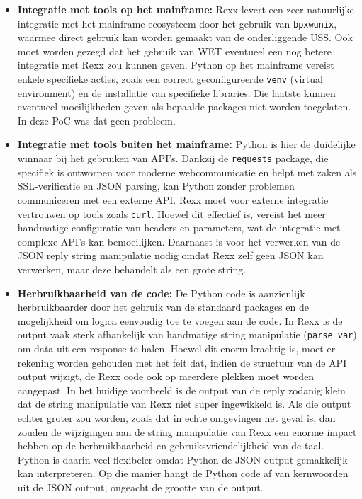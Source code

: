 \begin{itemize}
\item \textbf{Integratie met tools op het mainframe:}
Rexx levert een zeer natuurlijke integratie met het mainframe ecosysteem door het gebruik van \texttt{bpxwunix}, waarmee direct gebruik kan worden gemaakt van de onderliggende USS. Ook moet worden gezegd dat het gebruik van WET eventueel een nog betere integratie met Rexx zou kunnen geven. Python op het mainframe vereist enkele specifieke acties, zoals een correct geconfigureerde \texttt{venv} (virtual environment) en de installatie van specifieke libraries. Die laatste kunnen eventueel moeilijkheden geven als bepaalde packages niet worden toegelaten. In deze PoC was dat geen probleem.

\item \textbf{Integratie met tools buiten het mainframe:}
Python is hier de duidelijke winnaar bij het gebruiken van API's. Dankzij de \texttt{requests} package, die specifiek is ontworpen voor moderne webcommunicatie en helpt met zaken als SSL-verificatie en JSON parsing, kan Python zonder problemen communiceren met een externe API. Rexx moet voor externe integratie vertrouwen op tools zoals \texttt{curl}. Hoewel dit effectief is, vereist het meer handmatige configuratie van headers en parameters, wat de integratie met complexe API's kan bemoeilijken. Daarnaast is voor het verwerken van de JSON reply string manipulatie nodig omdat Rexx zelf geen JSON kan verwerken, maar deze behandelt als een grote string.

\item \textbf{Herbruikbaarheid van de code:}
De Python code is aanzienlijk herbruikbaarder door het gebruik van de standaard packages en de mogelijkheid om logica eenvoudig toe te voegen aan de code. In Rexx is de output vaak sterk afhankelijk van handmatige string manipulatie (\texttt{parse var}) om data uit een response te halen. Hoewel dit enorm krachtig is, moet er rekening worden gehouden met het feit dat, indien de structuur van de API output wijzigt, de Rexx code ook op meerdere plekken moet worden aangepast. In het huidige voorbeeld is de output van de reply zodanig klein dat de string manipulatie van Rexx niet super ingewikkeld is. Als die output echter groter zou worden, zoals dat in echte omgevingen het geval is, dan zouden de wijzigingen aan de string manipulatie van Rexx een enorme impact hebben op de herbruikbaarheid en gebruiksvriendelijkheid van de taal. Python is daarin veel flexibeler omdat Python de JSON output gemakkelijk kan interpreteren. Op die manier hangt de Python code af van kernwoorden uit de JSON output, ongeacht de grootte van de output. 


\end{itemize}

